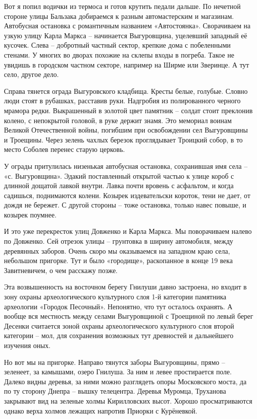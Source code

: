 Вот я попил водички из термоса и готов крутить педали дальше. По нечетной стороне улицы Бальзака добираемся к разным автомастерским и магазинам. Автобусная остановка с романтичным названием «Автостоянка». Сворачиваем на узкую улицу Карла Маркса – начинается Выгуровщина, уцелевший западный её кусочек. Слева – добротный частный сектор, крепкие дома с побеленными стенами. У многих во дворах похожие на склепы входы в погреба. Такое не увидишь в городском частном секторе, например на Ширме или Зверинце. А тут село, другое дело.

Справа тянется ограда Выгуровского кладбища. Кресты белые, голубые. Словно люди стоят в рубашках, расставив руки. Надгробия из полированного черного мрамора редки. Выкрашенный в золотой цвет памятник – солдат стоит преклонив колено, с непокрытой головой, в руке держит знамя. Это мемориал воинам Великой Отечественной войны, погибшим при освобождении сел Выгуровщины и Троещины. Через зелень чахлых березок проглядывает Троицкий собор, в то место Соболев перенес старую церковь.

У ограды притулилась низенькая автобусная остановка, сохранившая имя села – «с. Выгуровщина». Эдакий поставленный открытой частью к улице короб с длинной дощатой лавкой внутри. Лавка почти вровень с асфальтом, и когда садишься, поднимаются колени. Козырек издевательски короток, тени не дает, от дождя не бережет. С другой стороны – тоже остановка, только навес повыше, и козырек поумнее.

И это уже перекресток улиц Довженко и Карла Маркса. Мы поворачиваем налево по Довженко. Сей отрезок улицы – грунтовка в ширину автомобиля, между деревянных заборов. Очень скоро мы оказываемся на западном краю села, небольшом пригорке. Тут и было «городище», раскопанное в конце 19 века Завитневичем, о чем расскажу позже.

Эта возвышенность на восточном берегу Гнилуши давно застроена, но входит в зону охраны археологического культурного слоя 1-й категории памятника археологии «Городок Песочный». Непонятно, что тут осталось охранять. А вообще вся местность между селами Выгуровщиной с Троещиной по левый берег Десенки считается зоной охраны археологического культурного слоя второй категории – мол, для сохранения возможных тут древностей и дальнейшего изучения оных.

Но вот мы на пригорке. Направо тянутся заборы Выгуровщины, прямо – зеленеет, за камышами, озеро Гнилуша. За ним и левее простирается поле. Далеко видны деревья, за ними можно разглядеть опоры Московского моста, да по ту сторону Днепра – вышку телецентра. Деревья Муромца, Труханова закрывают вид на зеленые холмы Кирилловских высот. Хорошо просматриваются однако верха холмов лежащих напротив Приорки с Курёневкой. 

